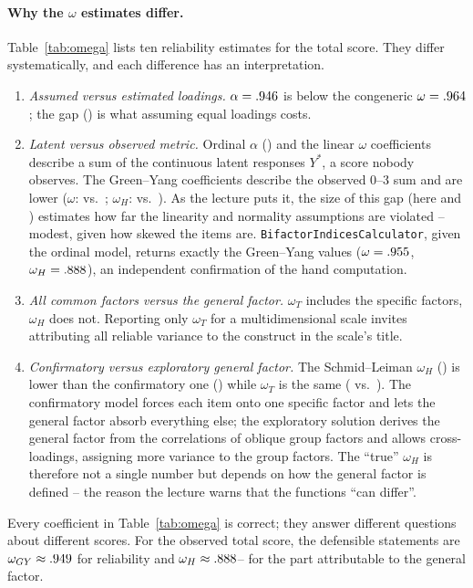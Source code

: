 \documentclass[11pt,a4paper]{article}
\begin{document}
\paragraph{Why the $\omega$ estimates differ.} Table~\ref{tab:omega} lists ten
reliability estimates for the total score. They differ systematically, and each
difference has an interpretation.
\begin{enumerate}[leftmargin=1.6em,itemsep=2pt,topsep=3pt]
\item \emph{Assumed versus estimated loadings.} $\alpha=.946$ is below the
  congeneric $\omega=.964$; the gap (\GapAlphaOmega) is what assuming equal
  loadings costs.
\item \emph{Latent versus observed metric.} Ordinal $\alpha$ (\OrdinalAlpha) and the
  linear $\omega$ coefficients describe a sum of the continuous latent responses $Y^*$, a
  score nobody observes. The Green--Yang coefficients describe the observed 0--3 sum and
  are lower ($\omega$: \OmegaTotalGY{} vs.\ \OmegaTotalLin; $\omega_H$: \OmegaHGY{} vs.\
  \OmegaH). As the lecture puts it, the size of this gap (here \GapLinGY{} and
  \GapLinGYH) estimates how far the linearity and normality assumptions are violated --
  modest, given how skewed the items are. \texttt{BifactorIndicesCalculator}, given the
  ordinal model, returns exactly the Green--Yang values ($\omega=.955$,
  $\omega_H=.888$), an independent confirmation of the hand computation.
\item \emph{All common factors versus the general factor.} $\omega_T$ includes the
  specific factors, $\omega_H$ does not. Reporting only $\omega_T$ for a multidimensional
  scale invites attributing all reliable variance to the construct in the scale's title.
\item \emph{Confirmatory versus exploratory general factor.} The Schmid--Leiman
  $\omega_H$ (\OmegaHEFA) is lower than the confirmatory one (\OmegaH) while $\omega_T$
  is the same (\OmegaTEFA{} vs.\ \OmegaT). The confirmatory model forces each item onto one
  specific factor and lets the general factor absorb everything else; the exploratory
  solution derives the general factor from the correlations of oblique group factors and
  allows cross-loadings, assigning more variance to the group factors. The ``true''
  $\omega_H$ is therefore not a single number but depends on how the general factor is
  defined -- the reason the lecture warns that the functions ``can differ''.
\end{enumerate}
Every coefficient in Table~\ref{tab:omega} is correct; they answer different questions
about different scores. For the observed total score, the defensible statements are
$\omega_{GY}\approx.949$ for reliability and $\omega_H\approx.888$--\OmegaH{}
for the part attributable to the general factor.
\end{document}
